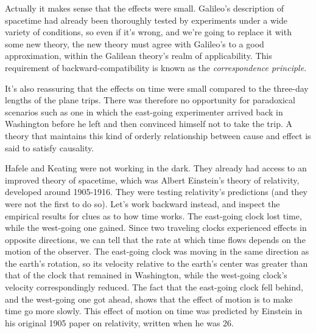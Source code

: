 Actually it makes sense that the effects were small.
Galileo's description of spacetime  had already been thoroughly tested by experiments under a wide variety of conditions,
so even if it's wrong, and we're going to replace it with some new theory, the
new theory must agree with Galileo's to a good approximation, within the Galilean theory's
realm of applicability. This requirement of backward-compatibility is known as
the \emph{correspondence principle}.

It's also reassuring that the effects on time were
small compared to the three-day lengths of the plane trips. There was therefore no
opportunity for paradoxical scenarios such as one in which the east-going experimenter arrived
back in Washington before he left and then convinced himself not to take the trip.
A theory that maintains this kind of orderly relationship between cause and effect is said to satisfy causality.

Hafele and Keating were not working in the dark. They already had access to an improved
theory of spacetime, which was Albert Einstein's theory of relativity, developed around 1905-1916.
They were testing relativity's predictions (and they were not the first to do so).
Let's work backward instead, and
inspect the empirical results for clues as to how time works.
The east-going clock lost time, while the west-going one gained.
Since two traveling clocks experienced effects in opposite directions,
we can tell that the rate at which time flows depends on the motion
of the observer. The east-going clock was moving in the same direction as the earth's rotation, so its velocity
relative to the earth's center was greater than that of the clock that remained in Washington, while the west-going 
clock's velocity
correspondingly reduced. The fact that the east-going clock fell behind, and the west-going one got ahead,
shows that the effect of motion is to make time go more slowly. This effect of motion on time was predicted by
Einstein in his original 1905 paper on relativity, written when he was 26.

\begin{figure}[h]\label{fig:iijima}
\end{figure}

